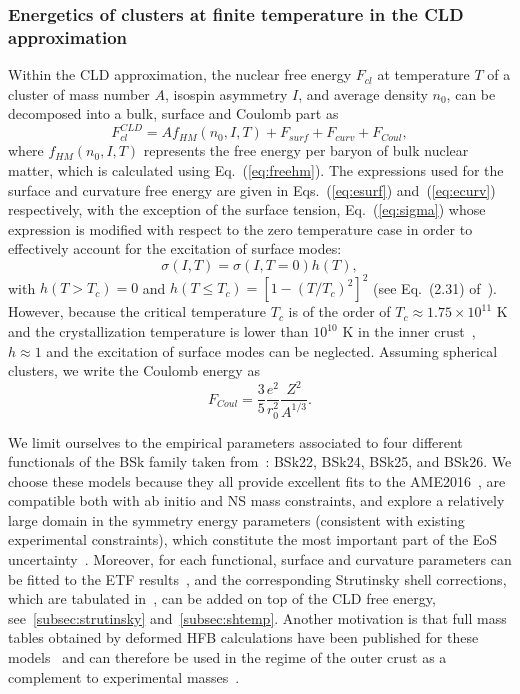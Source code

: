 \subsubsection{Energetics of clusters at finite temperature in the CLD
approximation}

Within the CLD approximation, the nuclear free energy $F_{cl}$ at temperature 
$T$ of a cluster of mass number $A$, isospin asymmetry $I$, and average density 
$n_0$, can be decomposed into a bulk, surface and Coulomb part as
%
\begin{equation}
  F_{cl}^{CLD} = A f_{HM}(n_0,I,T) + F_{surf} + F_{curv} + F_{Coul},
\end{equation}
%
where $f_{HM}(n_0, I, T)$ represents the free energy per baryon of bulk nuclear
matter, which is calculated using Eq.~(\ref{eq:freehm}).
The expressions used for the surface and curvature free energy are given
in Eqs.~(\ref{eq:esurf}) and~(\ref{eq:ecurv}) respectively, with the exception
of the surface tension, Eq.~(\ref{eq:sigma}) whose expression is modified with 
respect to the zero temperature case in order to effectively account for the 
excitation of surface modes:
%
\begin{equation}
  \sigma(I,T) = \sigma(I, T=0)h(T), 
\end{equation}
%
with $h(T>T_c) = 0$ and $h(T \leq T_c) = [1-(T/T_c)^2]^2$ (see Eq.~(2.31)
of~\cite{Lattimer1991}).
However, because the critical temperature $T_c$ is of the order of 
$T_c \approx 1.75 \times 10^{11}$ K and the crystallization temperature is 
lower than $10^{10}$ K in the inner crust~\cite{Haensel2007}, $h\approx 1$ and 
the excitation of surface modes can be neglected.
Assuming spherical clusters, we write the Coulomb energy as
%
\begin{equation}
  F_{Coul} = \frac{3}{5}\frac{e^2}{r_0^2}\frac{Z^2}{A^{1/3}}.
\end{equation}
%

We limit ourselves to the empirical parameters 
associated to four different functionals of the BSk family taken 
from~\cite{Goriely2013}: BSk22, BSk24, BSk25, and BSk26.
We choose these models because they all provide excellent fits to the 
AME2016~\cite{Huang2017}, are compatible both with ab initio and NS mass 
constraints, and explore a relatively large domain in the symmetry energy 
parameters (consistent with existing experimental constraints), which 
constitute the most important part of the EoS 
uncertainty~\cite{Pearson2014,Pearson2018}. Moreover, for each functional, 
surface and curvature parameters can be fitted to the ETF 
results~\cite{Pearson2019}, and the corresponding Strutinsky shell corrections, 
which are tabulated in~\cite{Pearson2018}, can be added on top of the CLD free 
energy, see~\ref{subsec:strutinsky} and~\ref{subsec:shtemp}.
Another motivation is that full mass tables obtained by deformed HFB 
calculations have been published for these models~\cite{Xu2013} and can 
therefore be used in the regime of the outer crust as a
complement to experimental masses~\cite{Fantina2020}.

